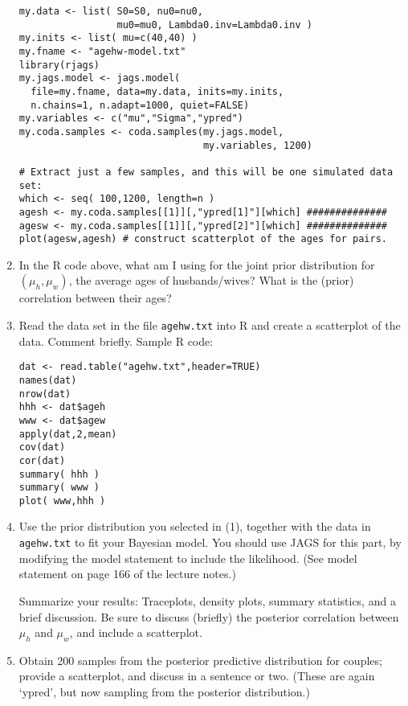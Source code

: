 \documentclass[12pt]{article}
\begin{document}
\begin{enumerate}
\begin{verbatim}
my.data <- list( S0=S0, nu0=nu0,
                 mu0=mu0, Lambda0.inv=Lambda0.inv )
my.inits <- list( mu=c(40,40) )
my.fname <- "agehw-model.txt"
library(rjags)
my.jags.model <- jags.model(
  file=my.fname, data=my.data, inits=my.inits,
  n.chains=1, n.adapt=1000, quiet=FALSE)
my.variables <- c("mu","Sigma","ypred")
my.coda.samples <- coda.samples(my.jags.model,
                                my.variables, 1200)

# Extract just a few samples, and this will be one simulated data set:
which <- seq( 100,1200, length=n )
agesh <- my.coda.samples[[1]][,"ypred[1]"][which] ##############
agesw <- my.coda.samples[[1]][,"ypred[2]"][which] ##############
plot(agesw,agesh) # construct scatterplot of the ages for pairs.
\end{verbatim}

\item In the R code above, what am I using for the joint prior distribution
for $(\mu_h,\mu_w)$, the average ages of husbands/wives? What is
the (prior) correlation between their ages?

\pagebreak

\item Read the data set in the file \verb+agehw.txt+ into R and create a
scatterplot of the data. Comment briefly. Sample R code:

\begin{verbatim}
dat <- read.table("agehw.txt",header=TRUE)
names(dat)
nrow(dat)
hhh <- dat$ageh
www <- dat$agew
apply(dat,2,mean)
cov(dat)
cor(dat)
summary( hhh )
summary( www )
plot( www,hhh )
\end{verbatim}

\item Use the prior distribution you selected in (1), together with the data
in \verb+agehw.txt+ to fit your Bayesian model. You should use JAGS for this part,
by modifying the model statement to include the likelihood. (See model
statement on page 166 of the lecture notes.)

Summarize your results: Traceplots, density plots, summary statistics,
and a brief discussion. Be sure to discuss (briefly) the posterior correlation
between $\mu_h$ and $\mu_w$, and include a scatterplot.

\item Obtain 200 samples from the posterior predictive distribution for
couples; provide a scatterplot, and discuss in a sentence or two.
(These are again `ypred', but now sampling from the posterior distribution.)


\end{enumerate}
\end{document}
